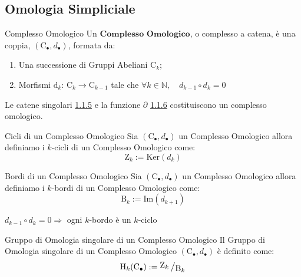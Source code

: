 \documentclass[11pt, a4paper, twoside]{article}
\newcommand{\bigslant}[2]{{\raisebox{.2em}{$#1$}\left/\raisebox{-.2em}{$#2$}\right.}}
\begin{document}
\subsection{Omologia Simpliciale}

\begin{defn}{Complesso Omologico}{}
	Un $\textbf{Complesso Omologico}$, o complesso a catena, è una coppia, $(\text{C}_{\bullet},d_{\bullet})$, formata da:
	\begin{enumerate}
		\item Una successione di Gruppi Abeliani  $\text{C}_k$;
		\item Morfismi $\text{d}_k:\,\text{C}_k\rightarrow\text{C}_{k-1}$ tale che $\forall k\in\mathbb{N},\quad d_{k-1}\circ d_{k}=0$
		\begin{center}
		\end{center}
	\end{enumerate}
\end{defn}

\begin{es}
	Le catene singolari \hyperref[catene singolari]{1.1.5} e la funzione $\partial$ \hyperref[partial]{1.1.6} costituiscono un complesso omologico.
\end{es}

\begin{defn}{Cicli di un Complesso Omologico}{}
	Sia $(\text{C}_{\bullet},d_{\bullet})$ un Complesso Omologico allora definiamo i $k$-cicli di un Complesso Omologico come:
	\[
		\text{Z}_k:=\text{Ker}(d_k)
	\]
\end{defn}

\begin{defn}{Bordi di un Complesso Omologico}{}
	Sia $(\text{C}_{\bullet},d_{\bullet})$ un Complesso Omologico allora definiamo i $k$-bordi di un Complesso Omologico come:
	\[
		\text{B}_k:=\text{Im}(d_{k+1})
	\]
\end{defn}

\begin{oss}
	$d_{k-1}\circ d_k=0\Rightarrow$ ogni $k$-bordo è un $k$-ciclo
\end{oss}

\begin{defn}{Gruppo di Omologia singolare di un Complesso Omologico}
	Il Gruppo di Omologia singolare di un Complesso Omologico $(\text{C}_{\bullet},d_{\bullet})$ è definito come:
	\[
		\text{H}_k(\text{C}_{\bullet}):= \bigslant{\text{Z}_k}{\text{B}_k}
	\]
\end{defn}
\end{document}
